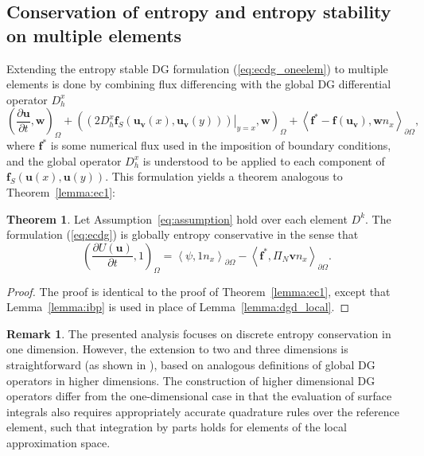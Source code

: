 \documentclass[preprint,10pt]{elsarticle}
\theoremstyle{definition}
\theoremstyle{lemma}
\newtheorem*{remark}{Remark}
\theoremstyle{theorem}
\newtheorem{theorem}{Theorem}
\theoremstyle{assumption}
\newcommand{\pd}[2]{\frac{\partial#1}{\partial#2}}
\newcommand{\LRp}[1]{\left( #1 \right)}
\newcommand{\LRa}[1]{\left\langle #1 \right\rangle}
\begin{document}
\subsection{Conservation of entropy and entropy stability on multiple elements}
\label{sec:multipleelems}
Extending the entropy stable DG formulation (\ref{eq:ecdg_oneelem}) to multiple elements is done by combining flux differencing with the global DG differential operator $D^x_h$
\begin{equation}
\LRp{\pd{\bm{u}}{t},\bm{w}}_{\Omega} + \LRp{\left.\LRp{2D^x_h\bm{f}_S(\bm{u}_{\bm{v}}(x),\bm{u}_{\bm{v}}(y))}\right|_{y=x},\bm{w}}_{\Omega} + \LRa{\bm{f}^*-\bm{f}(\bm{u}_{\bm{v}}),\bm{w}{n}_x}_{\partial \Omega},
\label{eq:ecdg}
\end{equation}
where $\bm{f}^*$ is some numerical flux used in the imposition of boundary conditions, and the global operator $D^x_h$ is understood to be applied to each component of $\bm{f}_S\LRp{\bm{u}(x),\bm{u}(y)}$.  This formulation yields a theorem analogous to Theorem~\ref{lemma:ec1}:
\begin{theorem}
\label{thm:ecdg_global}
Let Assumption~\ref{eq:assumption} hold over each element $D^k$.  The formulation (\ref{eq:ecdg}) is globally entropy conservative in the sense that
\[
\LRp{\pd{U(\bm{u})}{t},1}_{\Omega} =  \LRa{\psi,1{n}_x}_{\partial \Omega}-\LRa{{\bm{f}^*, \Pi_N\bm{v}}{n}_x}_{\partial \Omega}.
\]
\end{theorem}
\begin{proof}
The proof is identical to the proof of Theorem~\ref{lemma:ec1}, except that Lemma~\ref{lemma:ibp} is used in place of Lemma~\ref{lemma:dgd_local}.
\end{proof}

\begin{remark}
The presented analysis focuses on discrete entropy conservation in one dimension.  However, the extension to two and three dimensions is straightforward (as shown in \cite{chen2017entropy}), based on analogous definitions of global DG operators in higher dimensions.  The construction of higher dimensional DG operators differ from the one-dimensional case in that the evaluation of surface integrals also requires appropriately accurate quadrature rules over the reference element, such that integration by parts holds for elements of the local approximation space.  
\end{remark}
\end{document}
